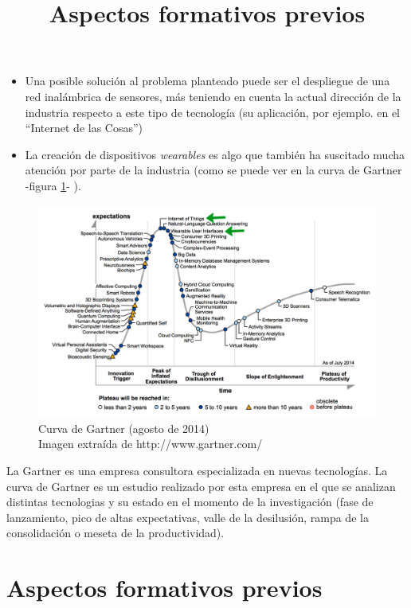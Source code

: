   \begin{itemize}
    \item Una posible solución al problema planteado puede ser el despliegue de una red inalámbrica de sensores,
    más teniendo en cuenta la actual dirección de la industria respecto a este tipo de tecnología (su aplicación,
    por ejemplo. en el “Internet de las Cosas”)
    \item La creación de dispositivos \textit{wearables} es algo que también ha suscitado
    mucha atención por parte de la industria (como se puede ver en la curva de Gartner -figura \ref{fig:curvaG}- ).
  \end{itemize}

  \begin{figure}[htb]
  \centering
  \captionsetup{justification=centering}
  \includegraphics[width=1\textwidth]{./imagenes/gartner}
  \caption{Curva de Gartner (agosto de 2014)\\
    \scriptsize{Imagen extraída de http://www.gartner.com/}
  \cite{gartnercurve}} \label{fig:curvaG}
  \end{figure}

La Gartner es una empresa consultora especializada en nuevas tecnologías. La curva de Gartner es
un estudio realizado por esta empresa en el que se analizan distintas tecnologias
y su estado en el momento de la investigación (fase de lanzamiento, pico
de altas expectativas, valle de la desilusión, rampa de la consolidación o meseta
de la productividad).\\

\title{Aspectos formativos previos}
\section{Aspectos formativos previos}

